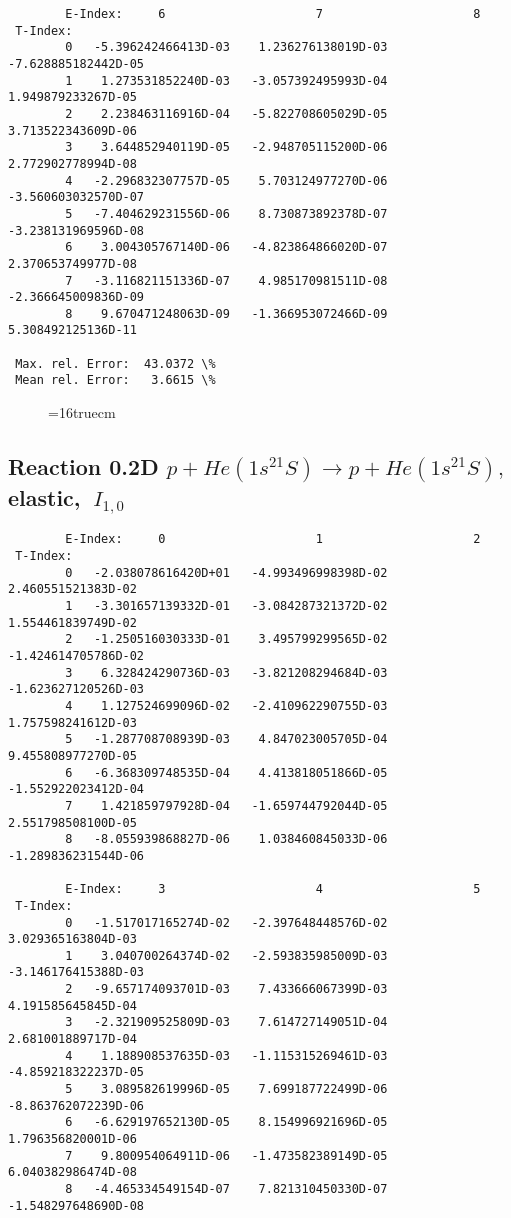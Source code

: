 \documentclass[12pt,dvipdfmx]{article}
\begin{document}
{\begin{small}
\begin{verbatim}
        E-Index:     6                     7                     8
 T-Index:
        0   -5.396242466413D-03    1.236276138019D-03   -7.628885182442D-05
        1    1.273531852240D-03   -3.057392495993D-04    1.949879233267D-05
        2    2.238463116916D-04   -5.822708605029D-05    3.713522343609D-06
        3    3.644852940119D-05   -2.948705115200D-06    2.772902778994D-08
        4   -2.296832307757D-05    5.703124977270D-06   -3.560603032570D-07
        5   -7.404629231556D-06    8.730873892378D-07   -3.238131969596D-08
        6    3.004305767140D-06   -4.823864866020D-07    2.370653749977D-08
        7   -3.116821151336D-07    4.985170981511D-08   -2.366645009836D-09
        8    9.670471248063D-09   -1.366953072466D-09    5.308492125136D-11

 Max. rel. Error:  43.0372 \%
 Mean rel. Error:   3.6615 \%

\end{verbatim}\end{small}
\begin{figure} \label{0.2T}
\epsfxsize=16truecm
\end{figure}
\newpage

\subsection{
Reaction 0.2D $ p + He(1s^21S) \rightarrow p + He(1s^21S) ,\  $
elastic, $ \  I_{1,0} $
}

\begin{small}\begin{verbatim}
        E-Index:     0                     1                     2
 T-Index:
        0   -2.038078616420D+01   -4.993496998398D-02    2.460551521383D-02
        1   -3.301657139332D-01   -3.084287321372D-02    1.554461839749D-02
        2   -1.250516030333D-01    3.495799299565D-02   -1.424614705786D-02
        3    6.328424290736D-03   -3.821208294684D-03   -1.623627120526D-03
        4    1.127524699096D-02   -2.410962290755D-03    1.757598241612D-03
        5   -1.287708708939D-03    4.847023005705D-04    9.455808977270D-05
        6   -6.368309748535D-04    4.413818051866D-05   -1.552922023412D-04
        7    1.421859797928D-04   -1.659744792044D-05    2.551798508100D-05
        8   -8.055939868827D-06    1.038460845033D-06   -1.289836231544D-06

        E-Index:     3                     4                     5
 T-Index:
        0   -1.517017165274D-02   -2.397648448576D-02    3.029365163804D-03
        1    3.040700264374D-02   -2.593835985009D-03   -3.146176415388D-03
        2   -9.657174093701D-03    7.433666067399D-03    4.191585645845D-04
        3   -2.321909525809D-03    7.614727149051D-04    2.681001889717D-04
        4    1.188908537635D-03   -1.115315269461D-03   -4.859218322237D-05
        5    3.089582619996D-05    7.699187722499D-06   -8.863762072239D-06
        6   -6.629197652130D-05    8.154996921696D-05    1.796356820001D-06
        7    9.800954064911D-06   -1.473582389149D-05    6.040382986474D-08
        8   -4.465334549154D-07    7.821310450330D-07   -1.548297648690D-08


\end{verbatim}
\end{small}}
\end{document}
